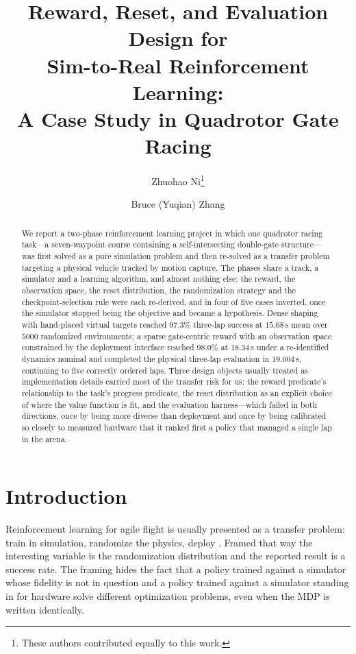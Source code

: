 \documentclass[10pt, twocolumn]{article}
\title{\textbf{Reward, Reset, and Evaluation Design for\\Sim-to-Real Reinforcement Learning:\\A Case Study in Quadrotor Gate Racing}}
\author{Zhuohao Ni\thanks{These authors contributed equally to this work.}
\and Bruce (Yuqian) Zhang\footnotemark[1]}
\date{}
\begin{document}
\maketitle

\begin{abstract}
\small\noindent
We report a two-phase reinforcement learning project in which one quadrotor
racing task---a seven-waypoint course containing a self-intersecting
double-gate structure---was first solved as a pure simulation problem and then
re-solved as a transfer problem targeting a physical vehicle tracked by motion
capture. The phases share a track, a simulator and a learning algorithm, and
almost nothing else: the reward, the observation space, the reset distribution,
the randomization strategy and the checkpoint-selection rule were each
re-derived, and in four of five cases inverted, once the simulator stopped
being the objective and became a hypothesis. Dense shaping with hand-placed
virtual targets reached $97.3\%$ three-lap success at $15.68$\,s mean over
$5000$ randomized environments; a sparse gate-centric reward with an
observation space constrained by the deployment interface reached $98.0\%$ at
$18.34$\,s under a re-identified dynamics nominal and completed the physical
three-lap evaluation in $19.004$\,s, continuing to five correctly ordered laps.
Three design objects usually treated as implementation details carried most of
the transfer risk for us: the reward predicate's relationship to the task's
progress predicate, the reset distribution as an explicit choice of where the
value function is fit, and the evaluation harness---which failed in both
directions, once by being more diverse than deployment and once by being
calibrated so closely to measured hardware that it ranked first a policy that
managed a single lap in the arena.
\end{abstract}

\section{Introduction}

Reinforcement learning for agile flight is usually presented as a transfer
problem: train in simulation, randomize the physics, deploy
\cite{loquercio2020,kaufmann2023,song2023}. Framed that way the interesting
variable is the randomization distribution and the reported result is a success
rate. The framing hides the fact that a policy trained against a simulator
whose fidelity is not in question and a policy trained against a simulator
standing in for hardware solve different optimization problems, even when the
MDP is written identically.
\end{document}
